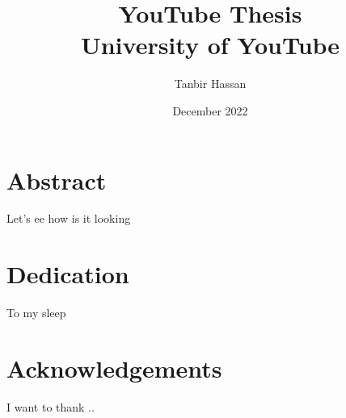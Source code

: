 \documentclass[twoside]{report}
\title{YouTube Thesis \\
{\Large University of YouTube}}
\author{Tanbir Hassan }
\date{December 2022}
\begin{document}
\maketitle

\chapter*{Abstract}
Let's ee how is it looking

\chapter*{Dedication}
To my sleep

\chapter*{Acknowledgements}
I want to thank ..

\tableofcontents
\listoffigures






\appendix 



\end{document}
